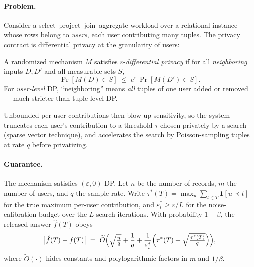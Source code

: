 \paragraph{Problem.}
Consider a select--project--join--aggregate workload over a relational instance whose
rows belong to \emph{users}, each user contributing many tuples. The privacy contract is
differential privacy at the granularity of users:

\begin{definition}\label{def:conc-dp}
A randomized mechanism $M$ satisfies $\varepsilon$-\emph{differential privacy} if for all
\emph{neighboring} inputs $D,D'$ and all measurable sets $S$,
\[
\Pr[M(D) \in S] \;\le\; e^{\varepsilon}\,\Pr[M(D') \in S].
\]
For \emph{user-level} DP, ``neighboring'' means \emph{all} tuples of one user added or
removed --- much stricter than tuple-level DP.
\end{definition}

Unbounded per-user contributions then blow up sensitivity, so the system
\cite{sigmod26-079} truncates each user's contribution to a threshold $\tau$ chosen
privately by a search (sparse vector technique), and accelerates the search by
Poisson-sampling tuples at rate $q$ before privatizing.


\paragraph{Guarantee.}

\begin{theorem}
\label{thm:conc-s4s}
The mechanism satisfies $(\varepsilon,0)$-DP. Let $n$ be the number of records, $m$ the
number of users, and $q$ the sample rate. Write $\tau^*(T) = \max_u \sum_{t \in T}
\mathbf{1}[u \prec t]$ for the true maximum per-user contribution, and
$\varepsilon_i^* \ge \varepsilon/L$ for the noise-calibration budget over the $L$
search iterations. With probability $1-\beta$, the released answer $\hat{f}(T)$ obeys
\[
\bigl|\hat{f}(T) - f(T)\bigr| \;=\;
\widetilde{O}\Bigl(\sqrt{\textstyle\frac{n}{q}} + \frac1q +
\frac{1}{\varepsilon_i^*}\Bigl(\tau^*(T) + \sqrt{\textstyle\frac{\tau^*(T)}{q}}\Bigr)\Bigr),
\]
where $\widetilde{O}(\cdot)$ hides constants and polylogarithmic factors in $m$ and
$1/\beta$. \eop
\end{theorem}

